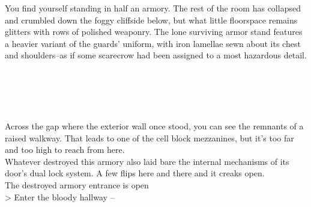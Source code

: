 You find yourself standing in half an armory. The rest of the room has collapsed and crumbled down the foggy cliffside below, but what little floorspace remains glitters with rows of polished weaponry. The lone surviving armor stand features a heavier variant of the guards' uniform, with iron lamellae sewn about its chest and shoulders--as if some scarecrow had been assigned to a most hazardous detail.\\
\\
\\
\\
\\
\\

Across the gap where the exterior wall once stood, you can see the remnants of a raised walkway. That leads to one of the cell block mezzanines, but it's too far and too high to reach from here.\\

Whatever destroyed this armory also laid bare the internal mechanisms of its door's dual lock system. A few flips here and there and it creaks open.\\
 The destroyed armory entrance is open\\

> Enter the bloody hallway -- \\
